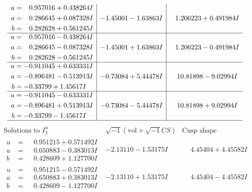\documentclass[1p]{elsarticle_modified}
\theoremstyle{definition}
\newcommand{\I}{\sqrt{-1}}
\begin{document}
$$\begin{array}{c|c|c}
\begin{aligned}
u &= \phantom{-}0.957016 + 0.438264 I \\
a &= \phantom{-}0.286645 + 0.087328 I \\
b &= \phantom{-}0.282628 + 0.561245 I\end{aligned}
 & -1.45001 - 1.63863 I & \phantom{-}1.206223 + 0.491984 I \\ \hline\begin{aligned}
u &= \phantom{-}0.957016 - 0.438264 I \\
a &= \phantom{-}0.286645 - 0.087328 I \\
b &= \phantom{-}0.282628 - 0.561245 I\end{aligned}
 & -1.45001 + 1.63863 I & \phantom{-}1.206223 - 0.491984 I \\ \hline\begin{aligned}
u &= -0.911045 + 0.633331 I \\
a &= -0.896481 - 0.513913 I \\
b &= -0.33799 + 1.45617 I\end{aligned}
 & -0.73084 + 5.44478 I & \phantom{-}10.81898 - 9.02994 I \\ \hline\begin{aligned}
u &= -0.911045 - 0.633331 I \\
a &= -0.896481 + 0.513913 I \\
b &= -0.33799 - 1.45617 I\end{aligned}
 & -0.73084 - 5.44478 I & \phantom{-}10.81898 + 9.02994 I\\
 \hline 
 \end{array}$$\newpage$$\begin{array}{c|c|c}  
\text{Solutions to }I^u_{1}& \I (\text{vol} + \sqrt{-1}CS) & \text{Cusp shape}\\
 \hline 
\begin{aligned}
u &= \phantom{-}0.951215 + 0.571492 I \\
a &= \phantom{-}0.650883 - 0.383013 I \\
b &= \phantom{-}0.428609 + 1.127700 I\end{aligned}
 & -2.13110 - 1.53175 I & \phantom{-}4.45404 + 4.45582 I \\ \hline\begin{aligned}
u &= \phantom{-}0.951215 - 0.571492 I \\
a &= \phantom{-}0.650883 + 0.383013 I \\
b &= \phantom{-}0.428609 - 1.127700 I\end{aligned}
 & -2.13110 + 1.53175 I & \phantom{-}4.45404 - 4.45582 I \\ \hline\begin{aligned}

\end{aligned}
\end{array}$$
\end{document}
